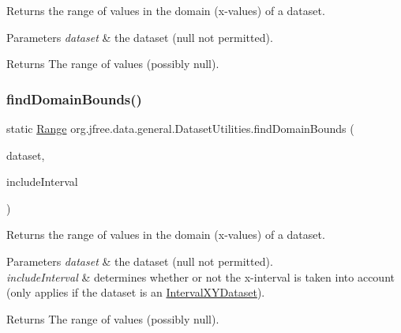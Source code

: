 Returns the range of values in the domain (x-\/values) of a dataset.


\begin{DoxyParams}{Parameters}
{\em dataset} & the dataset ({\ttfamily null} not permitted).\\
\hline
\end{DoxyParams}
\begin{DoxyReturn}{Returns}
The range of values (possibly {\ttfamily null}). 
\end{DoxyReturn}
\mbox{\label{classorg_1_1jfree_1_1data_1_1general_1_1_dataset_utilities_a0841a95a5e3f28ef32ce8ff8366370dc}} 
\subsubsection{\texorpdfstring{find\+Domain\+Bounds()}{findDomainBounds()}\hspace{0.1cm}{\footnotesize\ttfamily [2/3]}}
{\footnotesize\ttfamily static \mbox{\hyperlink{classorg_1_1jfree_1_1data_1_1_range}{Range}} org.\+jfree.\+data.\+general.\+Dataset\+Utilities.\+find\+Domain\+Bounds (\begin{DoxyParamCaption}\item[{\mbox{\hyperlink{interfaceorg_1_1jfree_1_1data_1_1xy_1_1_x_y_dataset}{X\+Y\+Dataset}}}]{dataset,  }\item[{boolean}]{include\+Interval }\end{DoxyParamCaption})\hspace{0.3cm}{\ttfamily [static]}}

Returns the range of values in the domain (x-\/values) of a dataset.


\begin{DoxyParams}{Parameters}
{\em dataset} & the dataset ({\ttfamily null} not permitted). \\
\hline
{\em include\+Interval} & determines whether or not the x-\/interval is taken into account (only applies if the dataset is an \mbox{\hyperlink{}{Interval\+X\+Y\+Dataset}}).\\
\hline
\end{DoxyParams}
\begin{DoxyReturn}{Returns}
The range of values (possibly {\ttfamily null}). 
\end{DoxyReturn}
\mbox{\label{classorg_1_1jfree_1_1data_1_1general_1_1_dataset_utilities_ae124faf1d4e65a6caff335960777df3f}} 

